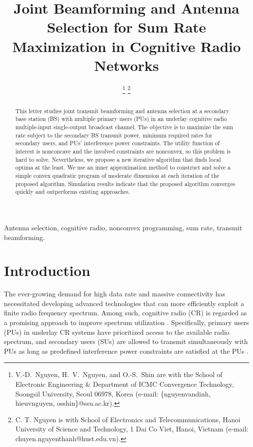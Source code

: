 \documentclass[english]{IEEEtran}
\theoremstyle{plain}
\theoremstyle{remark}
\begin{document}
\title{Joint Beamforming and Antenna Selection for Sum Rate Maximization in  Cognitive Radio Networks }
\author{
\thanks{V.-D.~Nguyen, H.~V.~Nguyen, and O.-S.~Shin are with the School of Electronic Engineering $\&$ Department of  ICMC Convergence Technology, Soongsil University, Seoul 06978, Korea  (e-mail: \{nguyenvandinh, hieuvnguyen, osshin\}@ssu.ac.kr).}
\thanks{C. T. Nguyen is with School of Electronics and Telecommunications, Hanoi University of Science and Technology, 1 Dai Co Viet, Hanoi, Vietnam (e-mail: chuyen.nguyenthanh@hust.edu.vn).}}
\maketitle
\begin{abstract}
This letter studies  joint  transmit beamforming and antenna selection at a secondary base station (BS) with multiple primary users (PUs) in an underlay cognitive radio multiple-input single-output broadcast channel. The objective is to maximize the sum rate subject to the secondary BS transmit power,  minimum   required  rates for secondary users, and PUs' interference power constraints. The utility function of interest is nonconcave and the involved constraints are  nonconvex, so this problem
is hard to solve. Nevertheless, we propose a new iterative algorithm  that finds local optima at the least. We use an inner approximation method to construct and solve  a simple convex quadratic program of moderate dimension at each iteration of the proposed algorithm.
Simulation results indicate that the proposed algorithm converges quickly  and outperforms existing approaches.
\end{abstract}
\begin{IEEEkeywords} Antenna selection, cognitive radio, nonconvex programming, sum rate, transmit beamforming. \end{IEEEkeywords}
\vspace*{-0.45cm}
\section{Introduction}
\label{introduction}
The ever-growing demand for high data rate and massive connectivity has necessitated developing advanced technologies  that can more efficiently  exploit a finite radio frequency spectrum. Among such, cognitive radio (CR)  is regarded  as a promising approach to  improve spectrum utilization \cite{Haykin05}. Specifically, primary users (PUs) in underlay CR systems have prioritized access to the available radio spectrum, and secondary users (SUs) are allowed to transmit simultaneously with PUs as long as predefined interference power constraints are satisfied at the PUs  \cite{Zhang08}.
\end{document}
